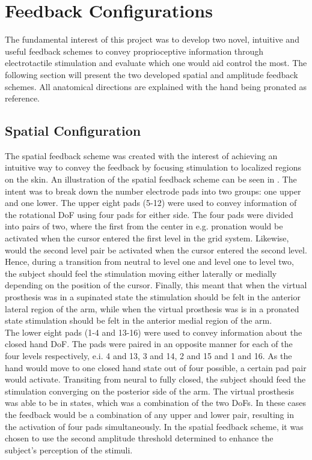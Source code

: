 \section{Feedback Configurations} \label{sec:feed}

The fundamental interest of this project was to develop two novel, intuitive and useful feedback schemes to convey proprioceptive information through electrotactile stimulation and evaluate which one would aid control the most. The following section will present the two developed spatial and amplitude feedback schemes. All anatomical directions are explained with the hand being pronated as reference.      

\subsection{Spatial Configuration}

The spatial feedback scheme was created with the interest of achieving an intuitive way to convey the feedback by focusing stimulation to localized regions on the skin. An illustration of the spatial feedback scheme can be seen in . The intent was to break down the number electrode pads into two groups: one upper and one lower. The upper eight pads (5-12) were used to convey information of the rotational DoF using four pads for either side.  The four pads were divided into pairs of two, where the first from the center in e.g. pronation would be activated when the cursor entered the first level in the grid system. Likewise, would the second level pair be activated when the cursor entered the second level. Hence, during a transition from neutral to level one and level one to level two, the subject should feel the stimulation moving either laterally or medially depending on the position of the cursor. Finally, this meant that when the virtual prosthesis was in a supinated state the stimulation should be felt in the anterior lateral region of the arm, while when the virtual prosthesis was is in a pronated state stimulation should be felt in the anterior medial region of the arm.   \\
The lower eight pads (1-4 and 13-16) were used to convey information about the closed hand DoF. The pads were paired in an opposite manner for each of the four levels respectively, e.i. 4 and 13, 3 and 14, 2 and 15 and 1 and 16. As the hand would move to one closed hand state out of four possible, a certain pad pair would activate. Transiting from neural to fully closed, the subject should feed the stimulation converging on the posterior side of the arm. The virtual prosthesis was able to be in states, which was a combination of the two DoFs. In these cases the feedback would be a combination of any upper and lower pair, resulting in the activation of four pads simultaneously. In the spatial feedback scheme, it was chosen to use the second amplitude threshold determined to enhance the subject's perception of the stimuli. 

